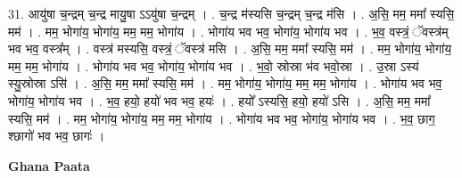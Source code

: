 \documentclass[17pt]{extarticle}
\begin{document}
31. आयु॑षा च॒न्द्रम् च॒न्द्र मायु॒षा ऽऽयु॑षा च॒न्द्रम् । . च॒न्द्र म॑स्यसि च॒न्द्रम् च॒न्द्र म॑सि । . अ॒सि॒ मम॒ ममा᳚ स्यसि॒ मम॑ । . मम॒ भोगा॑य॒ भोगा॑य॒ मम॒ मम॒ भोगा॑य । . भोगा॑य भव भव॒ भोगा॑य॒ भोगा॑य भव । . भ॒व॒ वस्त्रं॒ ॅवस्त्र॑म् भव भव॒ वस्त्र᳚म् । . वस्त्र॑ मस्यसि॒ वस्त्रं॒ ॅवस्त्र॑ मसि । . अ॒सि॒ मम॒ ममा᳚ स्यसि॒ मम॑ । . मम॒ भोगा॑य॒ भोगा॑य॒ मम॒ मम॒ भोगा॑य । . भोगा॑य भव भव॒ भोगा॑य॒ भोगा॑य भव । . भ॒वो॒ स्रोस्रा भ॑व भवो॒स्रा । . उ॒स्रा ऽस्य॑ स्यु॒स्रोस्रा ऽसि॑ । . अ॒सि॒ मम॒ ममा᳚ स्यसि॒ मम॑ । . मम॒ भोगा॑य॒ भोगा॑य॒ मम॒ मम॒ भोगा॑य । . भोगा॑य भव भव॒ भोगा॑य॒ भोगा॑य भव । . भ॒व॒ हयो॒ हयो॑ भव भव॒ हयः॑ । . हयो᳚ ऽस्यसि॒ हयो॒ हयो॑ ऽसि । . अ॒सि॒ मम॒ ममा᳚ स्यसि॒ मम॑ । . मम॒ भोगा॑य॒ भोगा॑य॒ मम॒ मम॒ भोगा॑य । . भोगा॑य भव भव॒ भोगा॑य॒ भोगा॑य भव । . भ॒व॒ छाग॒ श्छागो॑ भव भव॒ छागः॑ । \newline

\textbf{Ghana Paata } \newline
\end{document}
